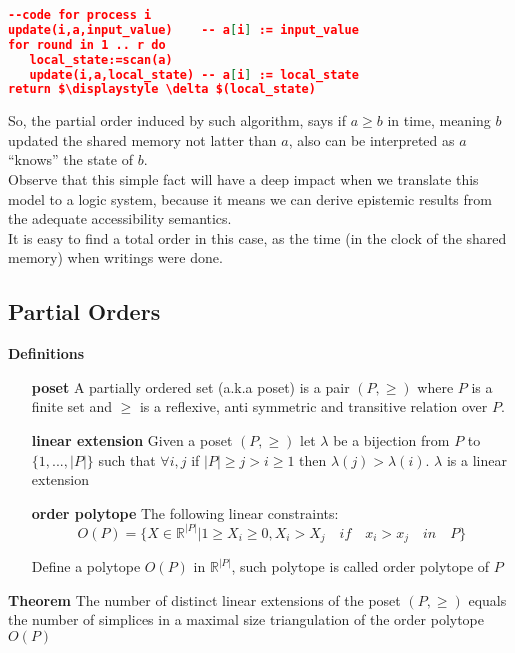 \documentclass[oneside,openany]{tufte-book} %
\begin{document}
\begin{lstlisting}[mathescape,language=json,firstnumber=1,basicstyle=\footnotesize,commentstyle=\color{gray},caption={Normal form wait free protocol},label=amb]
--code for process i 
update(i,a,input_value)    -- a[i] := input_value
for round in 1 .. r do
   local_state:=scan(a)
   update(i,a,local_state) -- a[i] := local_state
return $\displaystyle \delta $(local_state)
\end{lstlisting}

So, the partial order induced by such algorithm, says if $a \ge b$ in time, meaning $b$ updated the shared memory not latter than $a$, also can be interpreted as $a$ ``knows'' the state of $b$. \\
Observe that this simple fact will have a deep impact when we translate this model to a logic system, because it means we can derive epistemic results from the adequate accessibility semantics.\\
It is easy to find a total order in this case, as the time (in the clock of the shared memory) when writings were done.

\subsection{Partial Orders}

{\bf Definitions}
\begin{itemize}
\item[{\bf poset}] A partially ordered set (a.k.a poset) is a pair $(P,\ge)$ where $P$ is a finite set and $\ge$ is a reflexive, anti symmetric and transitive relation over $P$.
\item[{\bf linear extension}] Given a poset $(P,\ge)$ let $\lambda$ be a bijection from $P$ to $\{1,...,|P|\}$ such that $\forall i,j$ if $|P| \ge j > i \ge 1$ then $\lambda(j) > \lambda(i)$. $\lambda$ is a linear extension
\item[{\bf order polytope}] The following linear constraints:\\
$$
O(P)=\{X\in \mathbb{R}^{|P|} | 1 \ge X_i \ge 0, X_i > X_j \quad if \quad x_i > x_j \quad in \quad P  \}
$$

Define a polytope $O(P)$ in $ \mathbb{R}^{|P|} $, such polytope is called order polytope of  $P$ \cite{Stanley1986}
\end{itemize}

{\bf Theorem} The number of distinct linear extensions of the poset $(P,\ge)$ equals the number of simplices in a maximal size triangulation of the order polytope $O(P)$ \\
\end{document}
